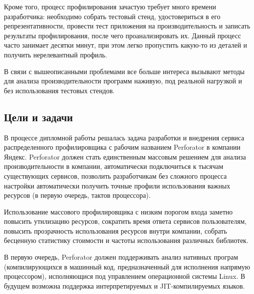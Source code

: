 Кроме того, процесс профилирования зачастую требует много времени разработчика: необходимо собрать тестовый стенд, удостовериться в его репрезентативности, провести тест приложения на производительность и записать результаты профилирования, после чего проанализировать их. Данный процесс часто занимает десятки минут, при этом легко пропустить какую-то из деталей и получить нерелевантный профиль.

В связи с вышеописанными проблемами все больше интереса вызывают методы для анализа производительности программ наживую, под реальной нагрузкой и без использования тестовых стендов.

\subsection{Цели и задачи}
В процессе дипломной работы решалась задача разработки и внедрения сервиса распределенного профилировщика с рабочим названием Perforator в компании Яндекс.
Perforator должен стать единственным массовым решением для анализа производительности в компании, автоматически подключиться к тысячам существующих сервисов, позволить разработчикам без сложного процесса настройки автоматически получить точные профили использования важных ресурсов (в первую очередь, тактов процессора).

Использование массового профилировщика с низким порогом входа заметно повысить утилизацию ресурсов, сократить время ответа сервисов пользователям, повысить прозрачность использования ресурсов внутри компании, собрать бесценную статистику стоимости и частоты использования различных библиотек.

В первую очередь, Perforator должен поддерживать анализ нативных програм (компилирующихся в машинный код, предназначенный для исполнения напрямую процессором), исполняющися под управлением операционной системы Linux. В будущем возможна поддержка интерпретируемых и JIT-компилируемых языков.
